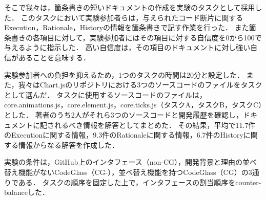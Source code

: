 そこで我々は，箇条書きの短いドキュメントの作成を実験のタスクとして採用した．
このタスクにおいて実験参加者らは，与えられたコード断片に関するExecution，Rationale，Historyの情報を箇条書きで記す作業を行った．
また箇条書きの各項目に対して，実験参加者にはその項目に対する自信度を0から100で与えるように指示した．
高い自信度は，その項目のドキュメントに対し強い自信があることを意味する．


実験参加者への負担を抑えるため，1つのタスクの時間は20分と設定した．
また，我々はChart.jsのリポジトリにおける3つのソースコードのファイルをタスクとして選んだ．
タスクに使用するソースコードのファイルは，core.animations.js，core.element.js，core.ticks.js（タスクA，タスクB，タスクC）とした．
著者のうち2人がそれら3つのソースコードと開発履歴を確認し，ドキュメントに記されるべき情報を解答としてまとめた．
その結果，平均で11.7件のExecutionに関する情報，9.3件のRationaleに関する情報，6.7件のHistoryに関する情報からなる解答を作成した．



実験の条件は，GitHub上のインタフェース（non-CG），開発背景と理由の並べ替え機能がないCodeGlass（CG-），並べ替え機能を持つCodeGlass（CG）の3通りである．
タスクの順序を固定した上で，インタフェースの割当順序をcounter-balanceした．


